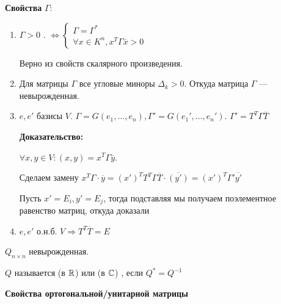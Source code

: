 \textbf{Свойства} $\Gamma$:
\begin{enumerate}
    \item $\Gamma >0$ . $\Leftrightarrow \begin{cases}
        \Gamma = \Gamma^*\\
        \forall x \in K^n, x^T \Gamma \overline{x} >0 
    \end{cases}$

    Верно из свойств скалярного произведения.   

    \item Для матрицы $\Gamma$ все угловые миноры $\Delta_k >0$. Откуда матрица $\Gamma$ --- невырожденная.

    \item $e,e'$ базисы $V$. $\Gamma = G(e_1,\ldots ,e_n), \Gamma' = G(e_1',\ldots,e_n')$. $\Gamma' = T^T\Gamma \overline{T}$

    \textbf{Доказательство:}

    $\forall x,y \in V: (x,y) = x^T \Gamma \overline{y}$.

    Сделаем замену $x^T \Gamma \cdot \overline{y}  = (x')^T T^T \Gamma \overline{T}\cdot \overline{(y')}= (x')^T \Gamma' \overline{y'}$

    Пусть $x' = E_i, y' = E_j$, тогда подставляя мы получаем поэлементное равенство матриц, откуда доказали

    \item $e,e'$ о.н.б. $V \Rightarrow T^T \overline{T} = E$

\end{enumerate}

 $Q_{n\times n}$ невырожденная. 

$Q$ называется  (в $\mathbb{R}$) или  (в $\mathbb{C}$) , если $Q^* = Q^{-1}$

\textbf{Свойства ортогональной/унитарной матрицы}

